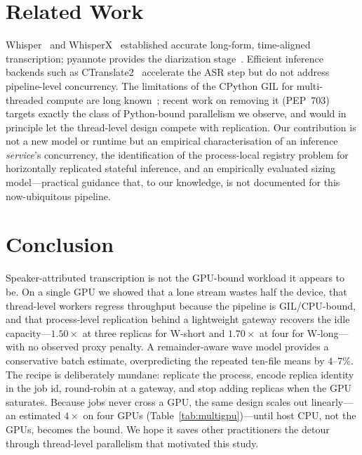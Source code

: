 \documentclass[10pt]{article}
\begin{document}
\section{Related Work}
\label{sec:related}

Whisper~\cite{radford2023whisper} and WhisperX~\cite{bain2023whisperx}
established accurate long-form, time-aligned transcription; pyannote provides the
diarization stage~\cite{bredin2020pyannote,bredin2023pyannote,plaquet2023powerset}.
Efficient
inference backends such as CTranslate2~\cite{ctranslate2} accelerate the ASR
step but do not address pipeline-level concurrency. The limitations of the
CPython GIL for multi-threaded compute are long known~\cite{cpythongil}; recent
work on removing it (PEP~703) targets exactly the class of Python-bound
parallelism we observe, and would in principle let the thread-level design
compete with replication. Our contribution is not a new model or runtime but an
empirical characterisation of an inference \emph{service}'s concurrency, the
identification of the process-local registry problem for horizontally replicated
stateful inference, and an empirically evaluated sizing model---practical
guidance that, to
our knowledge, is not documented for this now-ubiquitous pipeline.

\section{Conclusion}
\label{sec:conclusion}

Speaker-attributed transcription is not the GPU-bound workload it appears to be.
On a single GPU we showed that a lone stream wastes half the device, that
thread-level workers regress throughput because the pipeline is GIL/CPU-bound,
and that process-level replication behind a lightweight gateway recovers the
idle capacity---$1.50\times$ at three replicas for W-short and $1.70\times$ at
four for W-long---with no observed proxy penalty. A remainder-aware wave model
provides a conservative batch estimate, overpredicting the repeated ten-file
means by $4$--$7\%$. The recipe is deliberately
mundane: replicate the
process, encode replica identity in the job id, round-robin at a gateway, and
stop adding replicas when the GPU saturates. Because jobs never cross a GPU, the
same design scales out linearly---an estimated $4\times$ on four GPUs
(Table~\ref{tab:multigpu})---until host CPU, not the GPUs, becomes the bound. We
hope it saves other practitioners the detour through thread-level parallelism
that motivated this study.
\end{document}
